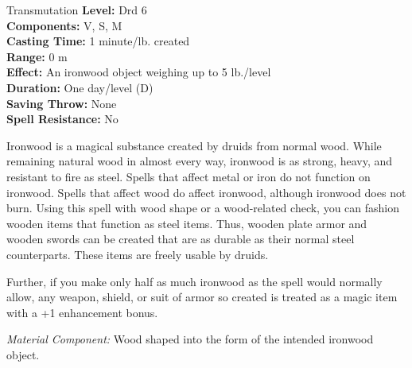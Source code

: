 {Transmutation}
{
	\textbf{Level:}
	Drd 6\\
	\textbf{Components:}
	V, S, M\\
	\textbf{Casting Time:}
	1 minute/lb. created\\
	\textbf{Range:}
	0 m\\
	\textbf{Effect:}
	An ironwood object weighing up to 5 lb./level\\
	\textbf{Duration:}
	One day/level (D)\\
	\textbf{Saving Throw:}
	None\\
	\textbf{Spell Resistance:}
	No\\
}
{
	Ironwood is a magical substance created by druids from normal wood. While remaining natural wood in almost every way, ironwood is as strong, heavy, and resistant to fire as steel. Spells that affect metal or iron do not function on ironwood. Spells that affect wood do affect ironwood, although ironwood does not burn. Using this spell with wood shape or a wood-related  check, you can fashion wooden items that function as steel items. Thus, wooden plate armor and wooden swords can be created that are as durable as their normal steel counterparts. These items are freely usable by druids.

	Further, if you make only half as much ironwood as the spell would normally allow, any weapon, shield, or suit of armor so created is treated as a magic item with a +1 enhancement bonus.

	\textit{Material Component:}
	Wood shaped into the form of the intended ironwood object.

}
